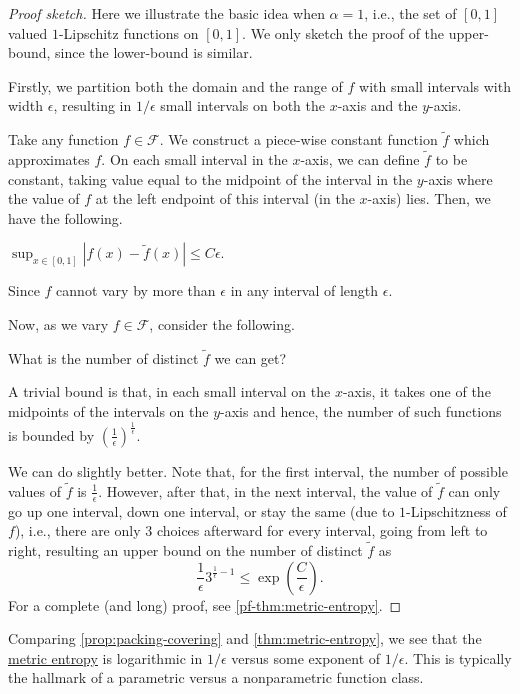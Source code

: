 \begin{proof}[Proof sketch]
	Here we illustrate the basic idea when \(\alpha = 1\), i.e., the set of \([0,1]\) valued \(1\)-Lipschitz functions on \([0,1]\). We only sketch the proof of the upper-bound, since the lower-bound is similar.

	Firstly, we partition both the domain and the range of \(f\) with small intervals with width \(\epsilon\), resulting in \(1/\epsilon\) small intervals on both the \(x\)-axis and the \(y\)-axis.

	Take any function \(f \in \mathscr{F} \). We construct a piece-wise constant function \(\widetilde{f}\) which approximates \(f\). On each small interval in the \(x\)-axis, we can define \(\widetilde{f}\) to be constant, taking value equal to the midpoint of the interval in the \(y\)-axis where the value of \(f\) at the left endpoint of this interval (in the \(x\)-axis) lies. Then, we have the following.
	\begin{claim}
		\(\sup_{x \in [0,1]} |f(x) - \widetilde{f}(x)| \leq C \epsilon\).
	\end{claim}
	\begin{explanation}
		Since \(f\) cannot vary by more than \(\epsilon\) in any interval of length \(\epsilon\).
	\end{explanation}

	Now, as we vary \(f \in \mathscr{F} \), consider the following.

	\begin{problem*}
		What is the number of distinct \(\widetilde{f}\) we can get?
	\end{problem*}
	A trivial bound is that, in each small interval on the \(x\)-axis, it takes one of the midpoints of the intervals on the \(y\)-axis and hence, the number of such functions is bounded by \((\frac{1}{\epsilon})^{\frac{1}{\epsilon}}\).

	We can do slightly better. Note that, for the first interval, the number of possible values of \(\widetilde{f}\) is \(\frac{1}{\epsilon}\). However, after that, in the next interval, the value of \(\widetilde{f}\) can only go up one interval, down one interval, or stay the same (due to \(1\)-Lipschitzness of \(f\)), i.e., there are only \(3\) choices afterward for every interval, going from left to right, resulting an upper bound on the number of distinct \(\widetilde{f}\) as
	\[
		\frac{1}{\epsilon} 3^{\frac{1}{\epsilon} - 1} \leq \exp(\frac{C}{\epsilon}).
	\]
	For a complete (and long) proof, see \autoref{pf-thm:metric-entropy}.
\end{proof}

\begin{remark}
	Comparing \autoref{prop:packing-covering} and \autoref{thm:metric-entropy}, we see that the \hyperref[def:metric-entropy]{metric entropy} is logarithmic in \(1 / \epsilon \) versus some exponent of \(1 / \epsilon \). This is typically the hallmark of a parametric versus a nonparametric function class.
\end{remark}
